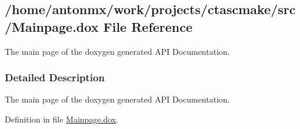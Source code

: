 \hypertarget{Mainpage_8dox}{
\subsection{/home/antonmx/work/projects/ctascmake/src/Mainpage.dox File Reference}
\label{Mainpage_8dox}
}


The main page of the doxygen generated API Documentation.  




\subsubsection{Detailed Description}
The main page of the doxygen generated API Documentation. 

Definition in file \hyperlink{Mainpage_8dox_source}{Mainpage.dox}.

